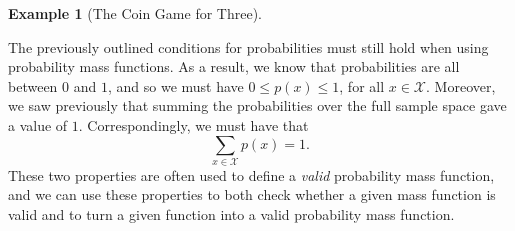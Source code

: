 \documentclass[
  letterpaper,
  DIV=11,
  numbers=noendperiod]{scrreprt}
\theoremstyle{definition}
\theoremstyle{definition}
\newtheorem{example}{Example}[chapter]
\theoremstyle{definition}
\theoremstyle{remark}
\begin{document}
\begin{example}[The Coin Game for
Three]
\begin{tcolorbox}[enhanced jigsaw, colback=white, colframe=quarto-callout-color-frame, arc=.35mm, leftrule=.75mm, rightrule=.15mm, opacityback=0, breakable, bottomrule=.15mm, left=2mm, toprule=.15mm]
\end{tcolorbox}



\end{example}

The previously outlined conditions for probabilities must still hold
when using probability mass functions. As a result, we know that
probabilities are all between \(0\) and \(1\), and so we must have
\(0 \leq p(x) \leq 1\), for all \(x\in\mathcal{X}\). Moreover, we saw
previously that summing the probabilities over the full sample space
gave a value of \(1\). Correspondingly, we must have that
\[\sum_{x\in\mathcal{X}} p(x) = 1.\] These two properties are often used
to define a \emph{valid} probability mass function, and we can use these
properties to both check whether a given mass function is valid and to
turn a given function into a valid probability mass function.
\end{document}
